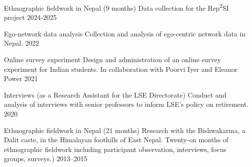 
\begin{cvexperiences}


  \cvexperience
    {Ethnographic fieldwork in Nepal (9 months)} %
    {Data collection for the Rep\textsuperscript{2}SI project} %
    {2024-2025} %


  \cvexperience
    {Ego-network data analysis} %
    {Collection and analysis of ego-centric network data in Nepal.} %
    {2022} %

  \cvexperience
    {Online survey experiment} %
    {Design and administration of an online survey experiment for Indian students. In collaboration with Poorvi Iyer and Eleanor Power} %
    {2021} %

  \cvexperience
    {Interviews (as a Research Assistant for the LSE Directorate)} %
    {Conduct and analysis of interviews with senior professors to inform LSE's policy on retirement.} %
    {2020} %


  \cvexperience
    {Ethnographic fieldwork in Nepal (21 months)} %
    {Research with the Bishwakarma, a Dalit caste, in the Himalayan foothills of East Nepal. Twenty-on months of ethnographic fieldwork including participant observation, interviews, focus groups, surveys.)} %
    {2013--2015} %

\end{cvexperiences}

